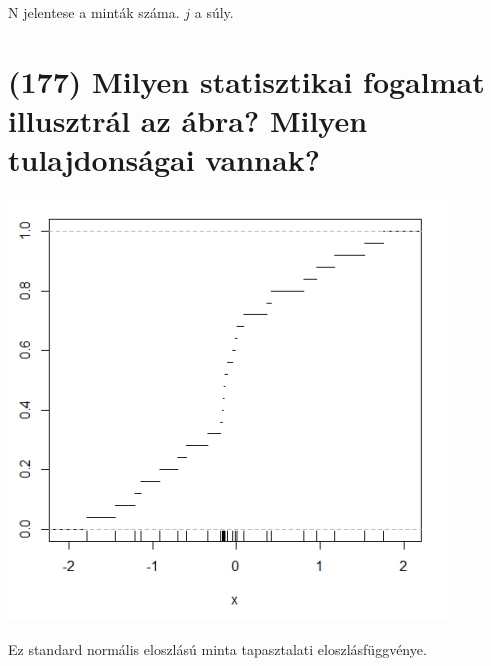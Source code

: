 \documentclass[12p]{article}
\begin{document}
N jelentese a minták száma. $j$ a súly.


\section{(177) Milyen statisztikai fogalmat illusztrál az ábra? Milyen tulajdonságai vannak?}

\includegraphics[scale=1.0]{gorbe2}

Ez standard normális eloszlású minta tapasztalati eloszlásfüggvénye.
\end{document}
